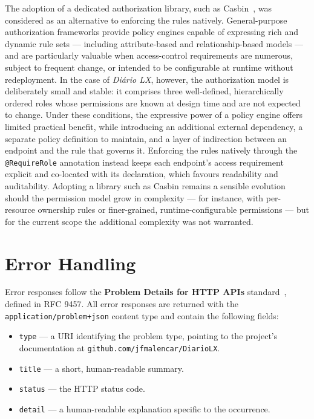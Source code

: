 The adoption of a dedicated authorization library, such as Casbin~\cite{casbin}, was
considered as an alternative to enforcing the rules natively. General-purpose
authorization frameworks provide policy engines capable of expressing rich and
dynamic rule sets --- including attribute-based and relationship-based models --- and
are particularly valuable when access-control requirements are numerous, subject to
frequent change, or intended to be configurable at runtime without redeployment. In
the case of \textit{Diário LX}, however, the authorization model is deliberately small and
stable: it comprises three well-defined, hierarchically ordered roles whose
permissions are known at design time and are not expected to change. Under these
conditions, the expressive power of a policy engine offers limited practical benefit,
while introducing an additional external dependency, a separate policy definition to
maintain, and a layer of indirection between an endpoint and the rule that governs it.
Enforcing the rules natively through the \texttt{@RequireRole} annotation instead
keeps each endpoint's access requirement explicit and co-located with its declaration,
which favours readability and auditability. Adopting a library such as Casbin remains
a sensible evolution should the permission model grow in complexity --- for instance,
with per-resource ownership rules or finer-grained, runtime-configurable permissions
--- but for the current scope the additional complexity was not warranted.

\section{Error Handling} \label{sec:be_errors}

Error responses follow the \textbf{Problem Details for HTTP APIs} standard~\cite{rfc9457},
defined in RFC 9457. All error responses are returned with the
\texttt{application/problem+json} content type and contain the following fields:

\begin{itemize}
    \item \texttt{type} --- a URI identifying the problem type, pointing to the
          project's documentation at \texttt{github.com/jfmalencar/DiarioLX}.
    \item \texttt{title} --- a short, human-readable summary.
    \item \texttt{status} --- the HTTP status code.
    \item \texttt{detail} --- a human-readable explanation specific to the occurrence.
\end{itemize}

